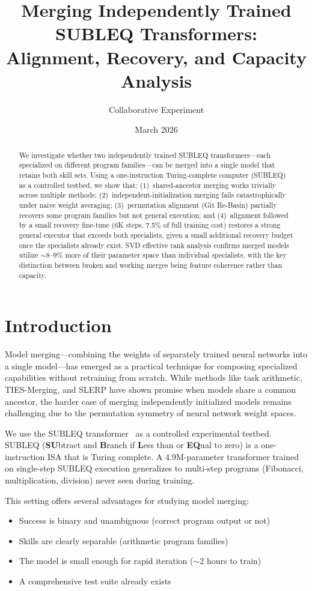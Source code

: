 \documentclass[11pt,a4paper]{article}
\title{Merging Independently Trained SUBLEQ Transformers:\\Alignment, Recovery, and Capacity Analysis}
\author{Collaborative Experiment}
\date{March 2026}
\begin{document}
\maketitle

\begin{abstract}
We investigate whether two independently trained SUBLEQ transformers---each specialized on different program families---can be merged into a single model that retains both skill sets. Using a one-instruction Turing-complete computer (SUBLEQ) as a controlled testbed, we show that: (1)~shared-ancestor merging works trivially across multiple methods; (2)~independent-initialization merging fails catastrophically under naive weight averaging; (3)~permutation alignment (Git Re-Basin) partially recovers some program families but not general execution; and (4)~alignment followed by a small recovery fine-tune (6K steps, 7.5\% of full training cost) restores a strong general executor that exceeds both specialists, given a small additional recovery budget once the specialists already exist. SVD effective rank analysis confirms merged models utilize ${\sim}8$--$9\%$ more of their parameter space than individual specialists, with the key distinction between broken and working merges being feature coherence rather than capacity.
\end{abstract}

\section{Introduction}

Model merging---combining the weights of separately trained neural networks into a single model---has emerged as a practical technique for composing specialized capabilities without retraining from scratch. While methods like task arithmetic, TIES-Merging, and SLERP have shown promise when models share a common ancestor, the harder case of merging independently initialized models remains challenging due to the permutation symmetry of neural network weight spaces.

We use the SUBLEQ transformer~\cite{anadim2025subleq} as a controlled experimental testbed. SUBLEQ (\textbf{SU}btract and \textbf{B}ranch if \textbf{L}ess than or \textbf{EQ}ual to zero) is a one-instruction ISA that is Turing complete. A 4.9M-parameter transformer trained on single-step SUBLEQ execution generalizes to multi-step programs (Fibonacci, multiplication, division) never seen during training.

This setting offers several advantages for studying model merging:
\begin{itemize}
    \item Success is binary and unambiguous (correct program output or not)
    \item Skills are clearly separable (arithmetic program families)
    \item The model is small enough for rapid iteration (${\sim}2$ hours to train)
    \item A comprehensive test suite already exists
\end{itemize}
\end{document}
